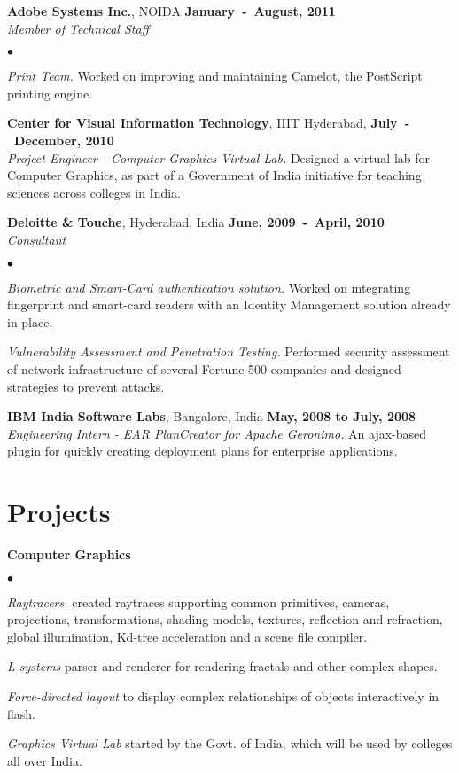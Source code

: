 \documentclass[margin,line]{res}
\newenvironment{list2}{
  \begin{list}{$\bullet$}{%
      \setlength{\itemsep}{0in}
      \setlength{\parsep}{0in} \setlength{\parskip}{0in}
      \setlength{\topsep}{0in} \setlength{\partopsep}{0in} 
      \setlength{\leftmargin}{0.2in}}}{\end{list}}
\begin{document}
\begin{resume}
{\bf Adobe Systems Inc.}, NOIDA \hfill {\bf January~-~August, 2011}\\
{\em Member of Technical Staff}\par
\begin{list2}
\item {\em Print Team.} Worked on improving and maintaining Camelot, the PostScript printing engine.
\end{list2}

{\bf Center for Visual Information Technology}, IIIT Hyderabad, \hfill {\bf July~-~December, 2010}\\
{\em Project Engineer - Computer Graphics Virtual Lab.} Designed a virtual lab for Computer Graphics, as part of a Government of India initiative for teaching sciences across colleges in India.

{\bf Deloitte \& Touche}, Hyderabad, India \hfill {\bf June, 2009~-~April, 2010}\\
{\em Consultant}\par
\begin{list2}
\item {\em Biometric and Smart-Card authentication solution.} Worked on integrating fingerprint
and smart-card readers with an Identity Management solution already in place.
\item {\em Vulnerability Assessment and Penetration Testing.} Performed security assessment
of network infrastructure of several Fortune 500 companies and designed strategies to prevent attacks.
\end{list2}

{\bf IBM India Software Labs}, Bangalore, India \hfill {\bf May, 2008 to July, 2008}\\
{\em Engineering Intern - EAR PlanCreator for Apache Geronimo.} An ajax-based plugin for quickly creating deployment plans for enterprise applications.

\section{\sc Projects}
{\bf Computer Graphics}
\begin{list2}
\item {\em Raytracers.} created raytraces supporting common primitives, cameras, projections, transformations,
shading models, textures, reflection and refraction, global illumination, Kd-tree acceleration and a scene file compiler.
\item {\em L-systems} parser and renderer for rendering fractals and other complex shapes.
\item {\em Force-directed layout} to display complex relationships of objects interactively in flash.
\item {\em Graphics Virtual Lab} started by the Govt. of India, which will be used by colleges all over India.
\end{list2}


\end{resume}
\end{document}
